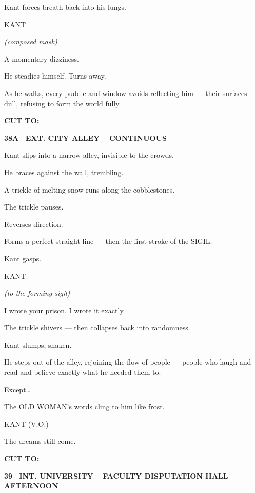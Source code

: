 \documentclass[12pt]{article}
\newcommand{\scene}[2]{%
  \vspace{1.8\baselineskip}%
  \noindent\textbf{#1 \ #2}\par\vspace{0.4\baselineskip}%
}
\newenvironment{dialogue}[1]{%
  \vspace{0.8\baselineskip}%
  \noindent\hspace*{2.3in}\textsc{#1}\par%
  \noindent\hspace*{1.5in}\begin{minipage}[t]{4.5in}%
}{%
  \end{minipage}\par%
}
\newcommand{\paren}[1]{%
  \noindent\hspace*{1.8in}\textit{(#1)}\par%
}
\newcommand{\transition}[1]{%
  \vspace{0.6\baselineskip}%
  \begin{flushright}\textbf{#1}\end{flushright}%
}
\begin{document}
Kant forces breath back into his lungs.

\begin{dialogue}{KANT}
\paren{composed mask}
A momentary dizziness.
\end{dialogue}

He steadies himself. Turns away.

As he walks, every puddle and window avoids reflecting him —
their surfaces dull, refusing to form the world fully.

\transition{CUT TO:}


\scene{38A}{EXT. CITY ALLEY -- CONTINUOUS}

Kant slips into a narrow alley, invisible to the crowds.

He braces against the wall, trembling.

A trickle of melting snow runs along the cobblestones.

The trickle pauses.

Reverses direction.

Forms a perfect straight line — then the first stroke of the SIGIL.

Kant gasps.

\begin{dialogue}{KANT}
\paren{to the forming sigil}
I wrote your prison.  
I wrote it exactly.
\end{dialogue}

The trickle shivers — then collapses back into randomness.

Kant slumps, shaken.

He steps out of the alley, rejoining the flow of people —
people who laugh and read and believe exactly what he needed them to.

Except…

The OLD WOMAN’s words cling to him like frost.

\begin{dialogue}{KANT (V.O.)}
The dreams still come.
\end{dialogue}

\transition{CUT TO:}


\scene{39}{INT. UNIVERSITY -- FACULTY DISPUTATION HALL -- AFTERNOON}
\end{document}
